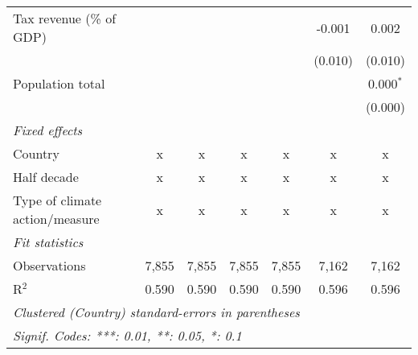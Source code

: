 \begin{tabular}{lcccccc}
   Tax revenue (\% of GDP)                 &         &              &              &              & -0.001        & 0.002\\   
                                           &         &              &              &              & (0.010)       & (0.010)\\   
   Population total                        &         &              &              &              &               & 0.000$^{*}$\\   
                                           &         &              &              &              &               & (0.000)\\   
   \emph{Fixed effects}\\
   Country                                 & x       & x            & x            & x            & x             & x\\  
   Half decade                             & x       & x            & x            & x            & x             & x\\  
   Type of climate action/measure          & x       & x            & x            & x            & x             & x\\  
   \midrule \emph{Fit statistics}\\
   Observations                            & 7,855   & 7,855        & 7,855        & 7,855        & 7,162         & 7,162\\  
   R$^2$                                   & 0.590   & 0.590        & 0.590        & 0.590        & 0.596         & 0.596\\  
   \midrule
   \multicolumn{7}{l}{\emph{Clustered (Country) standard-errors in parentheses}}\\
   \multicolumn{7}{l}{\emph{Signif. Codes: ***: 0.01, **: 0.05, *: 0.1}}\\
\end{tabular}
\par\endgroup


